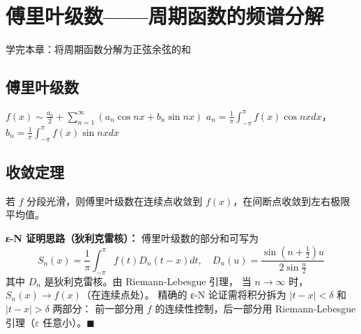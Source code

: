 \chapter{傅里叶级数——周期函数的频谱分解}
\begin{applicationbox}
学完本章：将周期函数分解为正弦余弦的和
\end{applicationbox}
\section{傅里叶级数} \(f(x)\sim\frac{a_0}{2}+\sum_{n=1}^\infty(a_n\cos nx+b_n\sin nx)\)
\(a_n=\frac1\pi\int_{-\pi}^\pi f(x)\cos nx dx\)，\(b_n=\frac1\pi\int_{-\pi}^\pi f(x)\sin nx dx\)

\section{收敛定理} 若 \(f\) 分段光滑，则傅里叶级数在连续点收敛到 \(f(x)\)，在间断点收敛到左右极限平均值。

\textbf{ε-N 证明思路（狄利克雷核）：} 傅里叶级数的部分和可写为
\[
S_n(x)=\frac1\pi\int_{-\pi}^\pi f(t)D_n(t-x)dt,\quad
D_n(u)=\frac{\sin(n+\frac12)u}{2\sin\frac u2}
\]
其中 \(D_n\) 是狄利克雷核。由 Riemann-Lebesgue 引理，
当 \(n\to\infty\) 时，\(S_n(x)\to f(x)\)（在连续点处）。
精确的 ε-N 论证需将积分拆为 \(|t-x|<\delta\) 和 \(|t-x|>\delta\) 两部分：
前一部分用 \(f\) 的连续性控制，后一部分用 Riemann-Lebesgue 引理（\(\varepsilon\) 任意小）。\(\blacksquare\)

